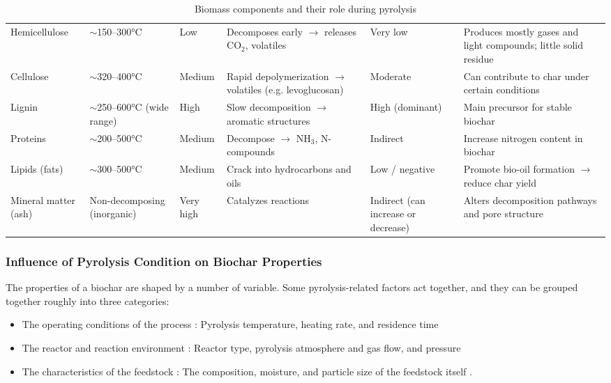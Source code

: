 \begin{table}[H]
\centering
\caption{Biomass components and their role during pyrolysis\cite{Chen2022,Armanu2024,Puri2024}}
\label{tab:biomass_components}
\tabwide
\begin{tabular}{L{2.0cm} L{2.3cm} L{1.7cm} L{3.2cm} L{2.3cm} L{2.8cm}}
\toprule
{} &  &  &  &  &  \\
\midrule
Hemicellulose & $\sim$150–300°C & Low & Decomposes early $\rightarrow$ releases CO$_2$, volatiles & Very low & Produces mostly gases and light compounds; little solid residue \\ \addlinespace

Cellulose & $\sim$320–400°C & Medium & Rapid depolymerization $\rightarrow$ volatiles (e.g. levoglucosan) & Moderate & Can contribute to char under certain conditions\cite{Armanu2024} \\ \addlinespace

Lignin & $\sim$250–600°C (wide range) & High & Slow decomposition $\rightarrow$ aromatic structures & High (dominant) & Main precursor for stable biochar \\ \addlinespace

Proteins & $\sim$200–500°C & Medium & Decompose $\rightarrow$ NH$_3$, N-compounds & Indirect & Increase nitrogen content in biochar \\ \addlinespace

Lipids (fats) & $\sim$300–500°C & Medium & Crack into hydrocarbons and oils & Low / negative & Promote bio-oil formation $\rightarrow$ reduce char yield \\ \addlinespace

Mineral matter (ash) & Non-decomposing (inorganic) & Very high & Catalyzes reactions & Indirect (can increase or decrease) & Alters decomposition pathways and pore structure \\
\bottomrule
\end{tabular}
\end{table}

\subsubsection{Influence of Pyrolysis Condition on Biochar Properties}
\label{Influence pyrolysis condition}

The properties of a biochar are shaped by a number of variable.  Some pyrolysis-related factors act together, and they can be grouped together roughly into three categories: 
\begin{itemize}
    \item The operating conditions of the process : Pyrolysis temperature, heating rate, and residence time
    \item The reactor and reaction environment : Reactor type, pyrolysis atmosphere and gas flow, and pressure
    \item The characteristics of the feedstock : The composition, moisture, and particle size of the feedstock itself \cite{Pahnila2023,leng-2018,manya-2012}.
\end{itemize}


